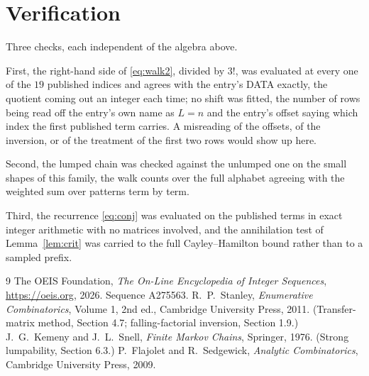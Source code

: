 \documentclass[11pt,a4paper]{article}
\theoremstyle{plain}
\theoremstyle{definition}
\begin{document}
\section{Verification}

Three checks, each independent of the algebra above.

First, the right-hand side of \eqref{eq:walk2}, divided by $3!$, was evaluated at every
one of the $19$ published indices and agrees with the entry's DATA exactly, the quotient
coming out an integer each time; no shift was fitted, the number of rows being read off the
entry's own name as $L=n$ and the entry's offset saying which index the first published
term carries. A misreading of the offsets, of the inversion, or of the treatment of the first
two rows would show up here.

Second, the lumped chain was checked against the unlumped one on the small shapes of this
family, the walk counts over the full alphabet agreeing with the weighted sum over patterns
term by term.

Third, the recurrence \eqref{eq:conj} was evaluated on the published terms in exact integer
arithmetic with no matrices involved, and the annihilation test of Lemma~\ref{lem:crit} was
carried to the full Cayley--Hamilton bound rather than to a sampled prefix.

\begin{thebibliography}{9}
 The OEIS Foundation, \emph{The On-Line Encyclopedia of Integer
Sequences}, \url{https://oeis.org}, 2026. Sequence A275563.
 R.~P.~Stanley, \emph{Enumerative Combinatorics}, Volume 1, 2nd ed.,
Cambridge University Press, 2011. (Transfer-matrix method, Section 4.7; falling-factorial
inversion, Section 1.9.)
 J.~G.~Kemeny and J.~L.~Snell, \emph{Finite Markov Chains}, Springer,
1976. (Strong lumpability, Section 6.3.)
 P.~Flajolet and R.~Sedgewick, \emph{Analytic Combinatorics}, Cambridge
University Press, 2009.
\end{thebibliography}
\end{document}
